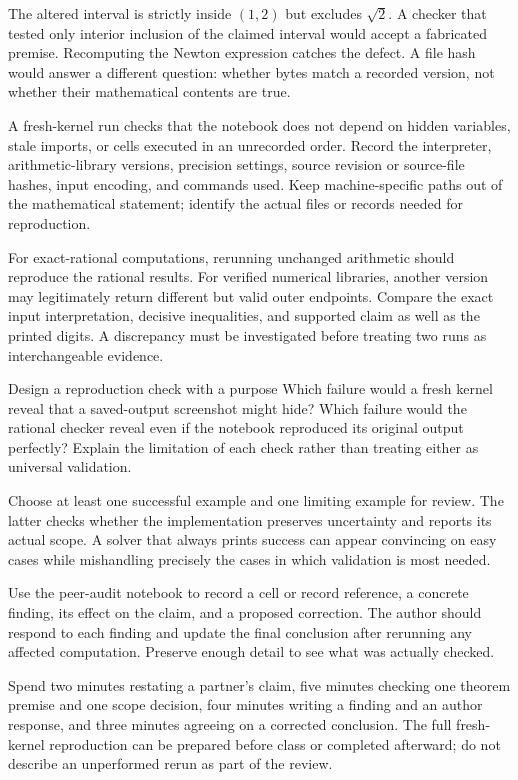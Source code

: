The altered interval is strictly inside $(1,2)$ but excludes $\sqrt2$.
A checker that tested only interior inclusion of the claimed interval
would accept a fabricated premise. Recomputing the Newton expression catches
the defect. A file hash would answer a different question: whether bytes
match a recorded version, not whether their mathematical contents are true.

A fresh-kernel run checks that the notebook does not depend on hidden
variables, stale imports, or cells executed in an unrecorded order. Record
the interpreter, arithmetic-library versions, precision settings, source
revision or source-file hashes, input encoding, and commands used. Keep
machine-specific paths out of the mathematical statement; identify the
actual files or records needed for reproduction.

For exact-rational computations, rerunning unchanged arithmetic should
reproduce the rational results. For verified numerical libraries, another
version may legitimately return different but valid outer endpoints.
Compare the exact input interpretation, decisive inequalities, and supported
claim as well as the printed digits. A discrepancy must be investigated
before treating two runs as interchangeable evidence.

\begin{question}{Design a reproduction check with a purpose}
Which failure would a fresh kernel reveal that a saved-output screenshot
might hide? Which failure would the rational checker reveal even if the
notebook reproduced its original output perfectly? Explain the limitation
of each check rather than treating either as universal validation.
\end{question}

Choose at least one successful example and one limiting example for review.
The latter checks whether the implementation preserves uncertainty and
reports its actual scope. A solver that always prints success can appear
convincing on easy cases while mishandling precisely the cases in which
validation is most needed.

Use the peer-audit notebook to record a cell or record reference, a concrete
finding, its effect on the claim, and a proposed correction. The author
should respond to each finding and update the final conclusion after rerunning
any affected computation. Preserve enough detail to see what was actually checked.

\newpage
{}
Spend two minutes restating a partner's claim, five minutes checking one
theorem premise and one scope decision, four minutes writing a finding and
an author response, and three minutes agreeing on a corrected conclusion.
The full fresh-kernel reproduction can be prepared before class or completed
afterward; do not describe an unperformed rerun as part of the review.

